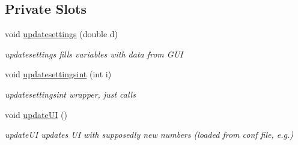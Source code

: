 \subsection*{Private Slots}
\begin{DoxyCompactItemize}
\item 
void \hyperlink{classcagecontrol_a244c02598b4b73db82b5852561634084}{updatesettings} (double d)
\begin{DoxyCompactList}\small\item\em updatesettings fills variables with data from G\+UI \end{DoxyCompactList}\item 
void \hyperlink{classcagecontrol_a2cfb7b65a7b8838d5f2acaa384a7cfcc}{updatesettingsint} (int i)
\begin{DoxyCompactList}\small\item\em updatesettingsint wrapper, just calls \end{DoxyCompactList}\item 
\mbox{\label{classcagecontrol_ab6993b1b41f55c164298c1b3e067ab34}} 
void \hyperlink{classcagecontrol_ab6993b1b41f55c164298c1b3e067ab34}{update\+UI} ()
\begin{DoxyCompactList}\small\item\em update\+UI updates UI with supposedly new numbers (loaded from conf file, e.\+g.) \end{DoxyCompactList}\end{DoxyCompactItemize}
